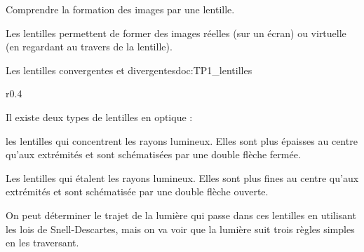 \tetePremStssVisi



\begin{objectifs}
  \item Comprendre la formation des images par une lentille.
\end{objectifs}

\begin{contexte}
  Les lentilles permettent de former des images réelles (sur un écran) ou virtuelle (en regardant au travers de la lentille).
  
\end{contexte}


\begin{doc}{Les lentilles convergentes et divergentes}{doc:TP1_lentilles}
  \begin{wrapfigure}[10]{r}{0.4\linewidth}
    \centering
    \vspace*{-42pt}
  \end{wrapfigure}
  
  Il existe deux types de lentilles en optique : 
  \begin{listePoints}
      \item les lentilles  qui concentrent les rayons lumineux.
      Elles sont plus épaisses au centre qu'aux extrémités et sont schématisées par une double flèche fermée.
      \item Les lentilles  qui étalent les rayons lumineux.
      Elles sont plus fines au centre qu'aux extrémités et sont schématisée par une double flèche ouverte.
  \end{listePoints}

  On peut déterminer le trajet de la lumière qui passe dans ces lentilles en utilisant les lois de Snell-Descartes, mais on va voir que la lumière suit trois règles simples en les traversant.
\end{doc}

